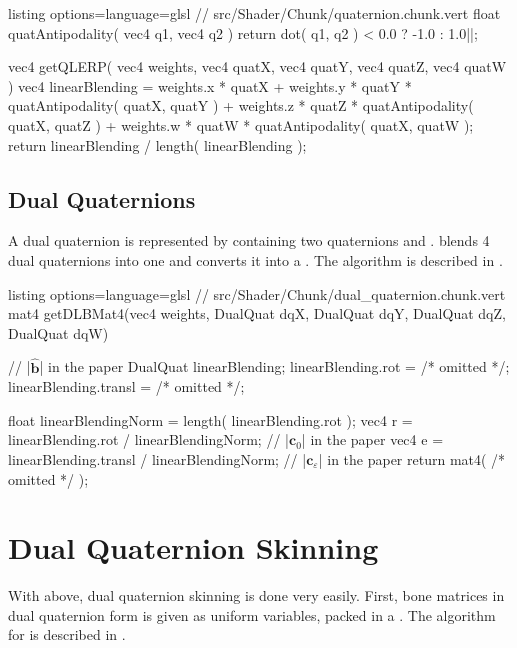 \documentclass{homework}
\begin{document}
\begin{tcblisting}{listing options={language=glsl}}
// src/Shader/Chunk/quaternion.chunk.vert
float quatAntipodality( vec4 q1, vec4 q2 ) {
  return dot( q1, q2 ) < 0.0 ? -1.0 : 1.0||;
}

vec4 getQLERP(
  vec4 weights, vec4 quatX, vec4 quatY, vec4 quatZ, vec4 quatW
) {
  vec4 linearBlending = weights.x * quatX
      + weights.y * quatY * quatAntipodality( quatX, quatY )
      + weights.z * quatZ * quatAntipodality( quatX, quatZ )
      + weights.w * quatW * quatAntipodality( quatX, quatW );
  return linearBlending / length( linearBlending );
}
\end{tcblisting}

\subsection{Dual Quaternions}
A dual quaternion is represented by  containing two quaternions  and .  blends 4 dual quaternions into one and converts it into a . The algorithm is described in \cite[Algorithm 1]{Kavan2008}.

\begin{tcblisting}{listing options={language=glsl}}
// src/Shader/Chunk/dual_quaternion.chunk.vert
mat4 getDLBMat4(vec4 weights, DualQuat dqX, DualQuat dqY, DualQuat dqZ, DualQuat dqW) {
  // |\color{commentcolor}$\hat {\mathbf b}$| in the paper
  DualQuat linearBlending;
  linearBlending.rot = /* omitted */;
  linearBlending.transl = /* omitted */;

  float linearBlendingNorm = length( linearBlending.rot );
  vec4 r = linearBlending.rot / linearBlendingNorm; // |\color{commentcolor}$\mathbf c_0$| in the paper
  vec4 e = linearBlending.transl / linearBlendingNorm; // |\color{commentcolor}$\mathbf c_\varepsilon$| in the paper
  return mat4( /* omitted */ );
}
\end{tcblisting}


\section{Dual Quaternion Skinning}
With  above, dual quaternion skinning is done very easily. First, bone matrices in dual quaternion form is given as uniform variables, packed in a . The algorithm for  is described in \cite[Equation (25)]{Kavan2008}.
\end{document}
